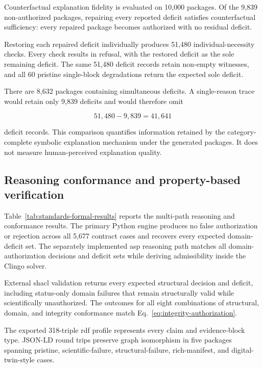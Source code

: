 \documentclass[11pt,a4paper]{article}
\begin{document}



Counterfactual explanation fidelity is evaluated on 10,000 packages. Of the
9,839 non-authorized packages, repairing every reported deficit satisfies
counterfactual sufficiency: every repaired package becomes authorized with no
residual deficit.

Restoring each repaired deficit individually produces 51,480
individual-necessity checks. Every check results in refusal, with the restored
deficit as the sole remaining deficit. The same 51,480 deficit records retain
non-empty witnesses, and all 60 pristine single-block degradations return the
expected sole deficit.

There are 8,632 packages containing simultaneous deficits. A single-reason
trace would retain only 9,839 deficits and would therefore omit

\[
51{,}480-9{,}839=41{,}641
\]

deficit records. This comparison quantifies information retained by the
category-complete symbolic explanation mechanism under the generated
packages. It does not measure human-perceived explanation quality.


\subsection{Reasoning conformance and property-based verification}
\label{subsec:conformance-results}

Table~\ref{tab:standards-formal-results} reports the multi-path reasoning and
conformance results. The primary Python engine produces no false
authorization or rejection across all 5,677 contract cases and recovers every
expected domain-deficit set. The separately implemented \ac{asp} reasoning
path matches all domain-authorization decisions and deficit sets while
deriving admissibility inside the Clingo solver.

External \ac{shacl} validation returns every expected structural decision and
deficit, including status-only domain failures that remain structurally valid
while scientifically unauthorized. The outcomes for all eight combinations
of structural, domain, and integrity conformance match
Eq.~\ref{eq:integrity-authorization}.

The exported 318-triple \ac{rdf} profile represents every claim and
evidence-block type. JSON-LD round trips preserve graph isomorphism in five
packages spanning pristine, scientific-failure, structural-failure,
rich-manifest, and digital-twin-style cases.
\end{document}
